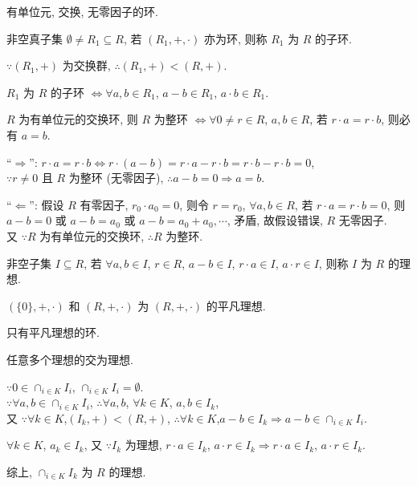 \documentclass{note}
\begin{document}
\begin{df}[整环]
    有单位元, 交换, 无零因子的环.
\end{df}

\begin{df}[子环]
    非空真子集 $\emptyset\neq R_1\subseteq R$, 若 $(R_1,+,\cdot)$ 亦为环, 则称 $R_1$ 为 $R$ 的子环.
\end{df}

$\because(R_1,+)$ 为交换群, $\therefore(R_1,+)<(R,+)$.

\begin{thm}[子环的判定]
    $R_1$ 为 $R$ 的子环 $\Longleftrightarrow\forall a,b\in R_1$, $a-b\in R_1$, $a\cdot b\in R_1$.
\end{thm}

\begin{thm}
    $R$ 为有单位元的交换环, 则 $R$ 为整环 $\Longleftrightarrow\forall 0\neq r\in R$, $a,b\in R$, 若 $r\cdot a=r\cdot b$, 则必有 $a=b$.
\end{thm}
\begin{pf}
    ``$\Longrightarrow$'': $r\cdot a=r\cdot b\Longleftrightarrow r\cdot(a-b)=r\cdot a-r\cdot b=r\cdot b-r\cdot b=0$,\\
    $\because r\neq 0$ 且 $R$ 为整环 (无零因子), $\therefore a-b=0\Longrightarrow a=b$.

    ``$\Longleftarrow$'': 假设 $R$ 有零因子, $r_0\cdot a_0=0$, 则令 $r=r_0$, $\forall a,b\in R$, 若 $r\cdot a=r\cdot b=0$, 则 $a-b=0$ 或 $a-b=a_0$ 或 $a-b=a_0+a_0,\cdots$, 矛盾, 故假设错误, $R$ 无零因子.\\
    又 $\because R$ 为有单位元的交换环, $\therefore R$ 为整环.
\end{pf}

\begin{df}[理想]
    非空子集 $I\subseteq R$, 若 $\forall a,b\in I$, $r\in R$, $a-b\in I$, $r\cdot a\in I$, $a\cdot r\in I$, 则称 $I$ 为 $R$ 的理想.
\end{df}

\begin{df}[平凡理想]
    $(\{0\},+,\cdot)$ 和 $(R,+,\cdot)$ 为 $(R,+,\cdot)$ 的平凡理想.
\end{df}

\begin{df}[单环]
    只有平凡理想的环.
\end{df}

\begin{thm}
    任意多个理想的交为理想.
\end{thm}
\begin{pf}
    $\because 0\in\cap_{i\in K}I_i$, $\cap_{i\in K}I_i=\emptyset$.\\
    $\because\forall a,b\in\cap_{i\in K}I_i$, $\therefore\forall a,b$, $\forall k\in K$, $a,b\in I_k$,\\
    又 $\because\forall k\in K$,$(I_k,+)<(R,+)$, $\therefore\forall k\in K$,$a-b\in I_k\Longrightarrow a-b\in\cap_{i\in K}I_i$.

    $\forall k\in K$, $a_k\in I_k$, 又 $\because I_k$ 为理想, $r\cdot a\in I_k$, $a\cdot r\in I_k\Longrightarrow r\cdot a\in I_k$, $a\cdot r\in I_k$.

    综上, $\cap_{i\in K}I_k$ 为 $R$ 的理想.
\end{pf}
\end{document}
